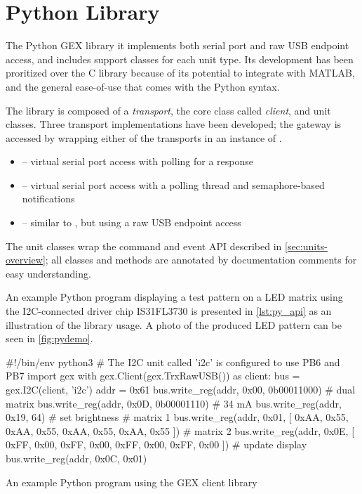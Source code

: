 \section{Python Library}

The Python GEX library it implements both serial port and raw USB endpoint access, and includes support classes for each unit type. Its development has been proritized over the C library because of its potential to integrate with MATLAB, and the general ease-of-use that comes with the Python syntax.

The library is composed of a \textit{transport}, the core class called \textit{client}, and unit classes. Three transport implementations have been developed; the gateway is accessed by wrapping either of the transports in an instance of .

\begin{itemize}
    \item {} -- virtual serial port access with polling for a response

    \item {} -- virtual serial port access with a polling thread and semaphore-based notifications

    \item {} -- similar to , but using a raw USB endpoint access
\end{itemize}

The unit classes wrap the command and event \gls{API} described in \cref{sec:units-overview}; all classes and methods are annotated by documentation comments for easy understanding.

An example Python program displaying a test pattern on a \gls{LED} matrix using the \gls{I2C}-connected driver chip IS31FL3730 is presented in \cref{lst:py_api} as an illustration of the library usage. A photo of the produced \gls{LED} pattern can be seen in \cref{fig:pydemo}.

\begin{listing}[h]
	\begin{pythoncode}
	#!/bin/env python3
	# The I2C unit called 'i2c' is configured to use PB6 and PB7
	import gex
	with gex.Client(gex.TrxRawUSB()) as client:
	    bus = gex.I2C(client, 'i2c')
	    addr = 0x61
	    bus.write_reg(addr, 0x00, 0b00011000) # dual matrix
	    bus.write_reg(addr, 0x0D, 0b00001110) # 34 mA
	    bus.write_reg(addr, 0x19, 64) # set brightness
	    # matrix 1
	    bus.write_reg(addr, 0x01, [
	        0xAA, 0x55, 0xAA, 0x55,
	        0xAA, 0x55, 0xAA, 0x55
	    ])
	    # matrix 2
	    bus.write_reg(addr, 0x0E, [
	        0xFF, 0x00, 0xFF, 0x00,
	        0xFF, 0x00, 0xFF, 0x00
	    ])
	    # update display
	    bus.write_reg(addr, 0x0C, 0x01)
	\end{pythoncode}
	\caption{\label{lst:py_api} An example Python program using the GEX client library}
\end{listing}

